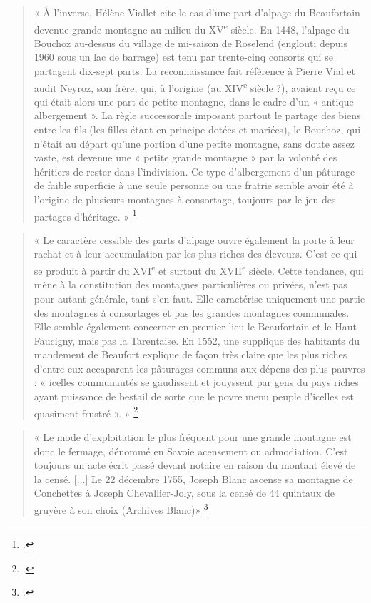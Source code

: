 \documentclass[12pt,a4paper]{report}
\begin{document}
		\begin{quote}
		« À l’inverse, Hélène Viallet cite le cas d’une part d’alpage du Beaufortain devenue grande montagne au milieu du XV\textsuperscript{e} siècle. En 1448, l’alpage du Bouchoz au-dessus du village de mi-saison de Roselend (englouti depuis 1960 sous un lac de barrage) est tenu par trente-cinq consorts qui se partagent dix-sept parts. La reconnaissance fait référence à Pierre Vial et audit Neyroz, son frère, qui, à l’origine (au XIV\textsuperscript{e} siècle ?), avaient reçu ce qui était alors une part de petite montagne, dans le cadre d’un « antique albergement ». La règle successorale imposant partout le partage des biens entre les fils (les filles étant en principe dotées et mariées), le Bouchoz, qui n’était au départ qu’une portion d’une petite montagne, sans doute assez vaste, est devenue une « petite grande montagne » par la volonté des héritiers de rester dans l’indivision. Ce type d’albergement d’un pâturage de faible superficie à une seule personne ou une fratrie semble avoir été à l’origine de plusieurs montagnes à consortage, toujours par le jeu des partages d’héritage. »
		\footcite[120]{Mouthon2019MontagnesMedievales}
	\end{quote}
	
	\begin{quote}
		« Le caractère cessible des parts d’alpage ouvre également la porte à leur rachat et à leur accumulation par les plus riches des éleveurs. C’est ce qui se produit à partir du XVI\textsuperscript{e} et surtout du XVII\textsuperscript{e} siècle. Cette tendance, qui mène à la constitution des montagnes particulières ou privées, n’est pas pour autant générale, tant s’en faut. Elle caractérise uniquement une partie des montagnes à consortages et pas les grandes montagnes communales. Elle semble également concerner en premier lieu le Beaufortain et le Haut-Faucigny, mais pas la Tarentaise. En 1552, une supplique des habitants du mandement de Beaufort explique de façon très claire que les plus riches d’entre eux accaparent les pâturages communs aux dépens des plus pauvres : « icelles communautés se gaudissent et jouyssent par gens du pays riches ayant puissance de bestail de sorte que le povre menu peuple d’icelles est quasiment frustré ». »
		\footcite[125]{Mouthon2019MontagnesMedievales}
	\end{quote}
	
	
	
	\begin{quote}
		« Le mode d'exploitation le plus fréquent pour une grande montagne est donc le fermage, dénommé en Savoie acensement ou admodiation. C'est toujours un acte écrit passé devant notaire en raison du montant élevé de la censé. [...] Le 22 décembre 1755, Joseph Blanc ascense sa 	montagne de Conchettes à Joseph Chevallier-Joly, sous la censé de 44 quintaux 	de gruyère à son choix (Archives Blanc)»
		\footcite[113]{HViallet1993}
	\end{quote}
	
\end{document}
